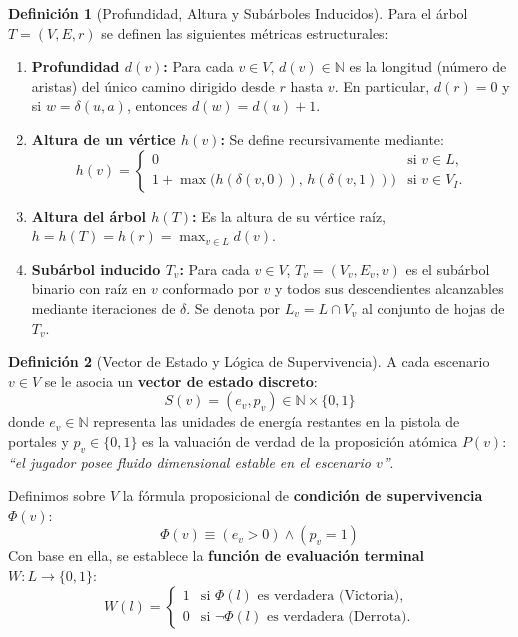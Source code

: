 \documentclass[11pt, a4paper]{article}
\theoremstyle{definition}
\newtheorem{definition}{Definición}[section]
\theoremstyle{plain}
\begin{document}
\begin{definition}[Profundidad, Altura y Subárboles Inducidos]
Para el árbol $T = (V, E, r)$ se definen las siguientes métricas estructurales:
\begin{enumerate}[noitemsep, topsep=2pt]
    \item \textbf{Profundidad $d(v)$:} Para cada $v \in V$, $d(v) \in \mathbb{N}$ es la longitud (número de aristas) del único camino dirigido desde $r$ hasta $v$. En particular, $d(r) = 0$ y si $w = \delta(u, a)$, entonces $d(w) = d(u) + 1$.
    \item \textbf{Altura de un vértice $h(v)$:} Se define recursivamente mediante:
    \[
        h(v) = \begin{cases}
            0 & \text{si } v \in L, \\
            1 + \max\big(h(\delta(v, 0)),\, h(\delta(v, 1))\big) & \text{si } v \in V_I.
        \end{cases}
    \]
    \item \textbf{Altura del árbol $h(T)$:} Es la altura de su vértice raíz, $h = h(T) = h(r) = \max_{v \in L} d(v)$.
    \item \textbf{Subárbol inducido $T_v$:} Para cada $v \in V$, $T_v = (V_v, E_v, v)$ es el subárbol binario con raíz en $v$ conformado por $v$ y todos sus descendientes alcanzables mediante iteraciones de $\delta$. Se denota por $L_v = L \cap V_v$ al conjunto de hojas de $T_v$.
\end{enumerate}
\end{definition}

\begin{definition}[Vector de Estado y Lógica de Supervivencia]
A cada escenario $v \in V$ se le asocia un \textbf{vector de estado discreto}:
\[
    S(v) = (e_v, p_v) \in \mathbb{N} \times \{0, 1\}
\]
donde $e_v \in \mathbb{N}$ representa las unidades de energía restantes en la pistola de portales y $p_v \in \{0, 1\}$ es la valuación de verdad de la proposición atómica $P(v)$: \textit{``el jugador posee fluido dimensional estable en el escenario $v$''}.

Definimos sobre $V$ la fórmula proposicional de \textbf{condición de supervivencia} $\Phi(v)$:
\[
    \Phi(v) \equiv (e_v > 0) \land (p_v = 1)
\]
Con base en ella, se establece la \textbf{función de evaluación terminal} $W: L \to \{0, 1\}$:
\[
    W(l) = \begin{cases}
        1 & \text{si } \Phi(l) \text{ es verdadera (Victoria)}, \\
        0 & \text{si } \neg\Phi(l) \text{ es verdadera (Derrota)}.
    \end{cases}
\]
\end{definition}
\end{document}
